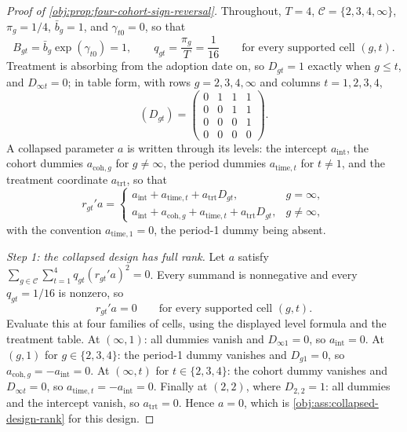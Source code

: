 \begin{proof}[Proof of \cref{obj:prop:four-cohort-sign-reversal}]
Throughout, \(T=4\), \(\mathcal C=\{2,3,4,\infty\}\), \(\pi_g=1/4\), \(\bar b_g=1\), and \(\gamma_{t0}=0\), so that
\[
B_{gt}=\bar b_g\exp(\gamma_{t0})=1,
\qquad
q_{gt}=\frac{\pi_g}{T}=\frac{1}{16}
\qquad\text{for every supported cell }(g,t).
\]
Treatment is absorbing from the adoption date on, so \(D_{gt}=1\) exactly when \(g\le t\), and \(D_{\infty t}=0\); in table form, with rows \(g=2,3,4,\infty\) and columns \(t=1,2,3,4\),
\[
(D_{gt})=
\begin{pmatrix}
0&1&1&1\\
0&0&1&1\\
0&0&0&1\\
0&0&0&0
\end{pmatrix}.
\]
A collapsed parameter \(a\) is written through its levels: the intercept \(a_{\text{int}}\), the cohort dummies \(a_{\text{coh},g}\) for \(g\neq\infty\), the period dummies \(a_{\text{time},t}\) for \(t\neq1\), and the treatment coordinate \(a_{\text{trt}}\), so that
\[
r_{gt}'a
=
\begin{cases}
a_{\text{int}}+a_{\text{time},t}+a_{\text{trt}}D_{gt}, & g=\infty,\\
a_{\text{int}}+a_{\text{coh},g}+a_{\text{time},t}+a_{\text{trt}}D_{gt}, & g\neq\infty,
\end{cases}
\]
with the convention \(a_{\text{time},1}=0\), the period-1 dummy being absent.

\textit{Step 1: the collapsed design has full rank.} Let \(a\) satisfy \(\sum_{g\in\mathcal C}\sum_{t=1}^4 q_{gt}(r_{gt}'a)^2=0\). Every summand is nonnegative and every \(q_{gt}=1/16\) is nonzero, so
\[
r_{gt}'a=0
\qquad\text{for every supported cell }(g,t).
\]
Evaluate this at four families of cells, using the displayed level formula and the treatment table. At \((\infty,1)\): all dummies vanish and \(D_{\infty1}=0\), so \(a_{\text{int}}=0\). At \((g,1)\) for \(g\in\{2,3,4\}\): the period-1 dummy vanishes and \(D_{g1}=0\), so \(a_{\text{coh},g}=-a_{\text{int}}=0\). At \((\infty,t)\) for \(t\in\{2,3,4\}\): the cohort dummy vanishes and \(D_{\infty t}=0\), so \(a_{\text{time},t}=-a_{\text{int}}=0\). Finally at \((2,2)\), where \(D_{2,2}=1\): all dummies and the intercept vanish, so \(a_{\text{trt}}=0\). Hence \(a=0\), which is \cref{obj:ass:collapsed-design-rank} for this design.


\end{proof}
